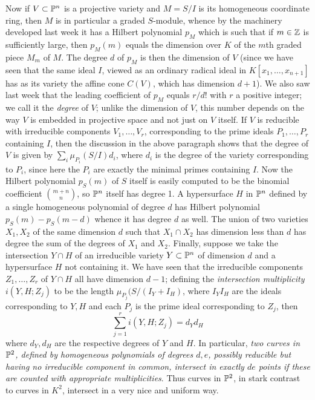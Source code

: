 Now if $V\subset\Bbb P^n$ is a projective variety and $M=S/I$ is its homogeneous coordinate ring, then $M$ is in particular a graded $S$-module, whence by the machinery developed last week it has a Hilbert polynomial $p_M$ which is such that if $m\in\Bbb Z$ is sufficiently large, then $p_M(m)$ equals the dimension over $K$ of the $m$th graded piece $M_m$ of $M$.  The degree $d$ of $p_M$ is then the dimension of $V$ (since we have seen that the same ideal $I$, viewed as an ordinary radical ideal in $K[x_1,\ldots,x_{n+1}]$ has as its variety the affine cone $C(V)$, which has dimension
$d+1$).  We also saw last week that the leading coefficient of $p_M$ equals $r/d!$ with $r$ a positive integer; we call it the {\sl degree} of $V$; unlike the dimension of $V$, this number depends on the way $V$ is embedded in projective space and not just on $V$ itself.  If $V$ is reducible with irreducible components $V_1,\ldots,V_r$, corresponding to the prime ideals $P_1,\ldots,P_r$ containing $I$, then the discussion in the above paragraph shows that the degree of $V$ is given by
 $\sum_i \mu_{P_i}(S/I) d_i$, where $d_i$ is the degree of the variety corresponding to $P_i$, since here the $P_i$ are exactly the minimal primes containing $I$.  Now the Hilbert polynomial $p_S(m)$ of $S$ itself is easily computed to be the binomial coefficient  $m+n\choose n$, so $\Bbb P^n$ itself has degree 1.  A hypersurface $H$ in $\Bbb P^n$ defined by a single homogeneous polynomial of degree $d$ has Hilbert polynomial $p_S(m) - p_S(m-d)$ whence it has degree $d$ as well.  The union of two varieties $X_1,X_2$ of the same dimension $d$ such that $X_1\cap X_2$ has dimension less than $d$ has degree the sum of the degrees of $X_1$ and $X_2$.  Finally, suppose we take the intersection $Y\cap H$ of an irreducible variety $Y\subset\Bbb P^n$ of dimension $d$ and a hypersurface $H$ not containing it.  We have seen that the irreducible components $Z_1,\ldots,Z_r$ of $Y\cap H$ all have dimension $d-1$; defining the {\sl intersection multiplicity} $i(Y,H;Z_j)$ to be the length $\mu_{P_j}(S/(I_Y + I_H)$, where $I_YI_H$ are the ideals corresponding to $Y,H$ and each $P_j$ is the prime ideal corresponding to $Z_j$, then 
 $$
 \sum_{j=1}^r i(Y,H;Z_j) = d_Y d_H
 $$
 \noindent where $d_Y,d_H$ are the respective degrees of $Y$ and $H$.  In particular, {\sl two curves in $\Bbb P^2$, defined by homogeneous polynomials of degrees $d,e$, possibly reducible but having no irreducible component in common, intersect in exactly $de$ points if these are counted with appropriate multiplicities}.   Thus curves in $\Bbb P^2$, in stark contrast to curves in $K^2$, intersect in a very nice and uniform way.